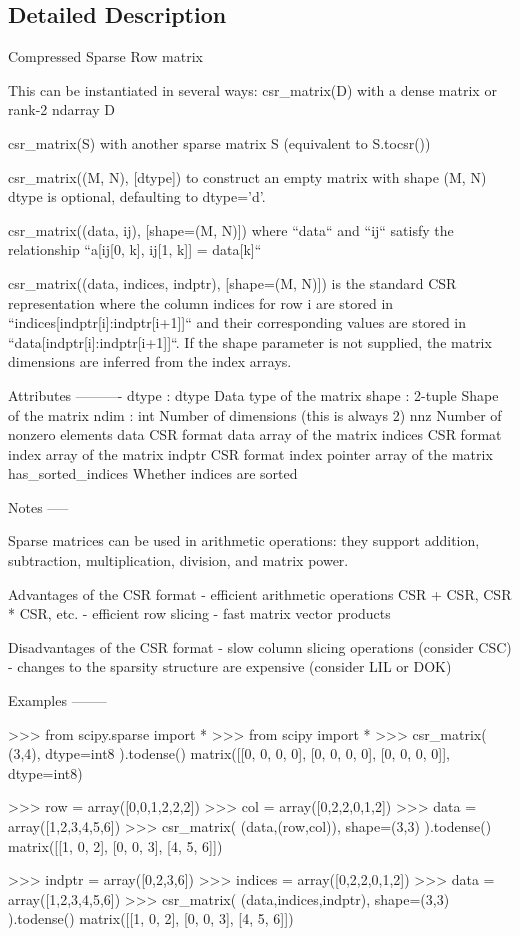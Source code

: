 \subsection{Detailed Description}
\begin{DoxyVerb}Compressed Sparse Row matrix

This can be instantiated in several ways:
    csr_matrix(D)
        with a dense matrix or rank-2 ndarray D

    csr_matrix(S)
        with another sparse matrix S (equivalent to S.tocsr())

    csr_matrix((M, N), [dtype])
        to construct an empty matrix with shape (M, N)
        dtype is optional, defaulting to dtype='d'.

    csr_matrix((data, ij), [shape=(M, N)])
        where ``data`` and ``ij`` satisfy the relationship
        ``a[ij[0, k], ij[1, k]] = data[k]``

    csr_matrix((data, indices, indptr), [shape=(M, N)])
        is the standard CSR representation where the column indices for
        row i are stored in ``indices[indptr[i]:indptr[i+1]]`` and their
        corresponding values are stored in ``data[indptr[i]:indptr[i+1]]``.
        If the shape parameter is not supplied, the matrix dimensions
        are inferred from the index arrays.

Attributes
----------
dtype : dtype
    Data type of the matrix
shape : 2-tuple
    Shape of the matrix
ndim : int
    Number of dimensions (this is always 2)
nnz
    Number of nonzero elements
data
    CSR format data array of the matrix
indices
    CSR format index array of the matrix
indptr
    CSR format index pointer array of the matrix
has_sorted_indices
    Whether indices are sorted

Notes
-----

Sparse matrices can be used in arithmetic operations: they support
addition, subtraction, multiplication, division, and matrix power.

Advantages of the CSR format
  - efficient arithmetic operations CSR + CSR, CSR * CSR, etc.
  - efficient row slicing
  - fast matrix vector products

Disadvantages of the CSR format
  - slow column slicing operations (consider CSC)
  - changes to the sparsity structure are expensive (consider LIL or DOK)

Examples
--------

>>> from scipy.sparse import *
>>> from scipy import *
>>> csr_matrix( (3,4), dtype=int8 ).todense()
matrix([[0, 0, 0, 0],
        [0, 0, 0, 0],
        [0, 0, 0, 0]], dtype=int8)

>>> row = array([0,0,1,2,2,2])
>>> col = array([0,2,2,0,1,2])
>>> data = array([1,2,3,4,5,6])
>>> csr_matrix( (data,(row,col)), shape=(3,3) ).todense()
matrix([[1, 0, 2],
        [0, 0, 3],
        [4, 5, 6]])

>>> indptr = array([0,2,3,6])
>>> indices = array([0,2,2,0,1,2])
>>> data = array([1,2,3,4,5,6])
>>> csr_matrix( (data,indices,indptr), shape=(3,3) ).todense()
matrix([[1, 0, 2],
        [0, 0, 3],
        [4, 5, 6]])\end{DoxyVerb}
 


